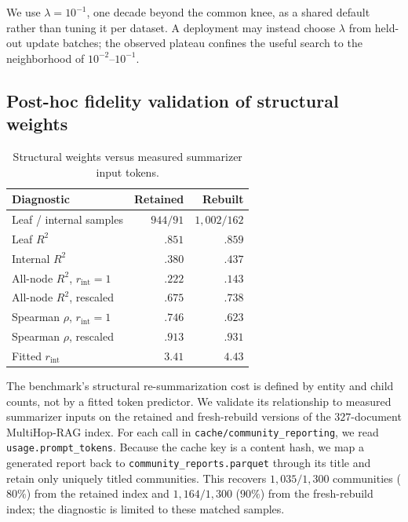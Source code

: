 We use $\lambda=10^{-1}$, one decade beyond the common knee, as a shared default
rather than tuning it per dataset. A deployment may instead choose $\lambda$
from held-out update batches; the observed plateau confines the useful search
to the neighborhood of $10^{-2}$--$10^{-1}$.

\subsection{Post-hoc fidelity validation of structural weights}
\label{app:proxy-cal}

\begin{table}[tb]
\centering
\caption{Structural weights versus measured summarizer input tokens.}
\label{tab:proxy-validation}
\begin{footnotesize}
\begin{tabular*}{\linewidth}{@{\extracolsep{\fill}}lrr@{}}
\toprule
\textbf{Diagnostic} & \textbf{Retained} & \textbf{Rebuilt} \\
\midrule
Leaf / internal samples & $944/91$ & $1{,}002/162$ \\
Leaf $R^2$ & $.851$ & $.859$ \\
Internal $R^2$ & $.380$ & $.437$ \\
\midrule
All-node $R^2$, $r_{\mathrm{int}}=1$ & $.222$ & $.143$ \\
All-node $R^2$, rescaled & $.675$ & $.738$ \\
Spearman $\rho$, $r_{\mathrm{int}}=1$ & $.746$ & $.623$ \\
Spearman $\rho$, rescaled & $.913$ & $.931$ \\
Fitted $r_{\mathrm{int}}$ & $3.41$ & $4.43$ \\
\bottomrule
\end{tabular*}
\end{footnotesize}
\end{table}

The benchmark's structural re-summarization cost is defined by entity and
child counts, not by a fitted token predictor. We validate its relationship to
measured summarizer inputs on the retained and fresh-rebuild versions of the
$327$-document MultiHop-RAG index. For each call in
\texttt{cache/community\_reporting}, we read
\texttt{usage.prompt\_tokens}. Because the cache key is a content hash, we map a
generated report back to \texttt{community\_reports.parquet} through its title
and retain only uniquely titled communities. This recovers $1{,}035/1{,}300$
communities ($80\%$) from the retained index and $1{,}164/1{,}300$ ($90\%$) from
the fresh-rebuild index; the diagnostic is limited to these matched samples.

